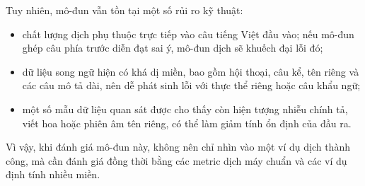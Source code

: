 Tuy nhiên, mô-đun vẫn tồn tại một số rủi ro kỹ thuật:
\begin{itemize}
    \item chất lượng dịch phụ thuộc trực tiếp vào câu tiếng Việt đầu vào; nếu mô-đun ghép
    câu phía trước diễn đạt sai ý, mô-đun dịch sẽ khuếch đại lỗi đó;
    \item dữ liệu song ngữ hiện có khá dị miền, bao gồm hội thoại, câu kể, tên riêng và các
    câu mô tả dài, nên dễ phát sinh lỗi với thực thể riêng hoặc câu khẩu ngữ;
    \item một số mẫu dữ liệu quan sát được cho thấy còn hiện tượng nhiễu chính tả, viết hoa
    hoặc phiên âm tên riêng, có thể làm giảm tính ổn định của đầu ra.
\end{itemize}

Vì vậy, khi đánh giá mô-đun này, không nên chỉ nhìn vào một ví dụ dịch thành công, mà
cần đánh giá đồng thời bằng các metric dịch máy chuẩn và các ví dụ định tính nhiều miền.

